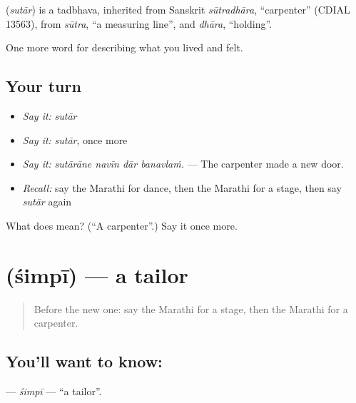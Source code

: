 \begin{cousinweb}
\textbf{} (\emph{sutār}) is a tadbhava, inherited from Sanskrit \emph{sūtradhāra}, \textquotedblleft{}carpenter\textquotedblright{} (CDIAL 13563), from \emph{sūtra}, \textquotedblleft{}a measuring line\textquotedblright{}, and \emph{dhāra}, \textquotedblleft{}holding\textquotedblright{}.
\end{cousinweb}

\begin{grammarlens}[title={What you've built}]
One more word for describing what you lived and felt.
\end{grammarlens}

\subsection*{Your turn}
\begin{itemize}
\raggedright
  \item \emph{Say it:} \emph{sutār}
  \item \emph{Say it:} \emph{sutār}, once more
  \item \emph{Say it:} \emph{sutārāne navīn dār banavlaṁ.} — The carpenter made a new door.
  \item \emph{Recall:} say the Marathi for dance, then the Marathi for a stage, then say \emph{sutār} again
\end{itemize}

\begin{tcolorbox}[breakable,colback=teal!4,colframe=teal!35!black,title={Before you move on}]
What does  mean? (\textquotedblleft{}A carpenter\textquotedblright{}.) Say it once more.
\end{tcolorbox}
\section[\texorpdfstring{\mr{शिंपी} (śimpī)}{शिंपी (śimpī)}]{ (śimpī) — a tailor}

\label{lesson:MR-C504-simpi}



\begin{quote}
Before the new one: say the Marathi for a stage, then the Marathi for a carpenter.
\end{quote}

\subsection*{You'll want to know: }
\textbf{} — \emph{śimpī} — \textquotedblleft{}a tailor\textquotedblright{}.

